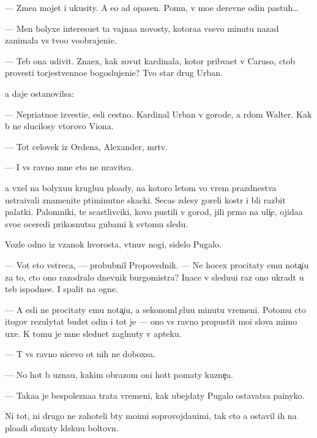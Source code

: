 \documentclass[10pt]{book}
\begin{document}
— Zme{\y}a mojet i ukusity. A {\y}e{\y}o {\y}ad opasen. Pomn{\io}, v mo{\y}e{\y} derevne odin pastuh…

— Men{\ia} bolyxe interesu{\y}et ta vajna{\y}a novosty, kotora{\y}a vsevo minutu nazad zanimala vs{\e} tvo{\y}o voobrajeni{\y}e.

— Teb{\ia} ona udivit. Zna{\y}ex, kak zovut kardinala, kotor{\yi}{\y} prib{\yi}va{\y}et v Caruso, ctob{\yi} provesti torjestvenno{\y}e bogoslujeni{\y}e? Tvo{\y} star{\yi}{\y} drug Urban.

{\Y}a daje ostanovilsa:

— Nepri{\y}atno{\y}e izvesti{\y}e, {\y}esli cestno. Kardinal Urban v gorode, a r{\ia}dom Walter. Kak b{\yi} ne slucilosy vtorovo Viona.

— Tot celovek iz Ordena, Alexander, m{\e}rtv.

— I vs{\e} ravno mne eto ne nravitsa.

{\Y}a v{\yi}xel na bolyxu{\y}u kruglu{\y}u plo{\x}ady, na kotoro{\y} letom vo vrem{\ia} prazdnestva ustra{\y}ivali znamenit{\yi}{\y}e p{\ia}timinutn{\yi}{\y}e skacki. Se{\y}cas zdesy goreli kostr{\yi} i b{\yi}li razbit{\yi} palatki. Palomniki, te scastlivciki, kovo pustili v gorod, jili pr{\ia}mo na uli{\c}e, ojida{\y}a svo{\y}e{\y} oceredi prikosnutsa gubami k sv{\ia}tomu sledu.

Vozle odno{\y} iz v{\ia}zanok hvorosta, v{\yi}t{\ia}nuv nogi, sidelo Pugalo.

— Vot eto vstreca, — probubnil Pro\-po\-ved\-nik. — Ne hocex procitaty {\y}emu nota{\c}i{\y}u za to, cto ono razodralo dnevnik burgomistra? Inace v sledu{\y}u{\x}i{\y} raz ono ukrad{\e}t u teb{\ia} ispodne{\y}e. I spalit na ogne.

— A {\y}esli ne procitaty {\y}emu nota{\c}i{\y}u, {\y}a sekonoml{\io} {\c}elu{\y}u minutu vremeni. Potomu cto itogov{\yi}{\y} rezulytat budet odin i tot je — ono vs{\e} ravno propustit mo{\y}i slova mimo uxe{\y}. K tomu je mne sledu{\y}et zagl{\ia}nuty v apteku.

— T{\yi} vs{\e} ravno nicevo ot nih ne dob{\y}oxsa.

— No hot{\ia} b{\yi} uzna{\y}u, kakim obrazom oni hot{\ia}t po{\y}maty kuzne{\c}a.

— Taka{\y}a je bespolezna{\y}a trata vremeni, kak ubejdaty Pugalo ostavatsa pa{\y}inyko{\y}.

Ni tot, ni drugo{\y} ne zahoteli b{\yi}ty mo{\y}imi soprovojda{\y}u{\x}imi, tak cto {\y}a ostavil ih na plo{\x}adi sluxaty l{\io}dsku{\y}u boltovn{\io}.
\end{document}
